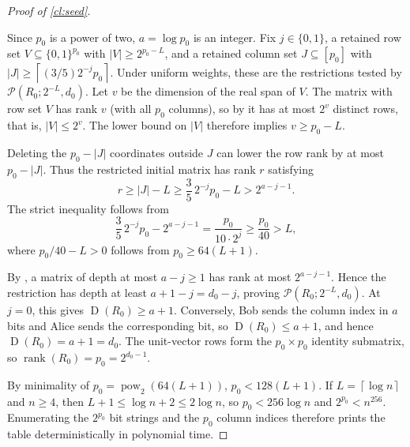 \documentclass[11pt,letterpaper]{article} \usepackage[utf8]{inputenc}
\theoremstyle{plain} \newtheorem{theorem}{Theorem}[section]
\theoremstyle{definition} \newaliascnt{definition}{theorem}
\newcommand{\D}{\operatorname{D}}
\newcommand{\RP}[3]{\mathcal{P}(#1;#2,#3)}
\newcommand{\card}[1]{\lvert#1\rvert}
\newcommand{\ceil}[1]{\left\lceil#1\right\rceil}
\DeclareMathOperator{\rank}{rank} \crefname{claim}{Claim}{Claims}
\begin{document}
\begin{proof}[Proof of \cref{cl:seed}]
\label{proof:cl:seed}

Since \(p_0\) is a power of two, \(a=\log p_0\) is an integer. Fix
\(j\in\{0,1\}\), a retained row set
\(V\subseteq\{0,1\}^{p_0}\) with \(\card V\ge2^{p_0-L}\), and a retained column
set \(J\subseteq[p_0]\) with \(\card J\ge\ceil{(3/5)2^{-j}p_0}\). Under uniform
weights, these are the restrictions tested by \(\RP{R_0}{2^{-L}}{d_0}\). Let \(v\) be
the dimension of the real span of \(V\). The matrix with row set \(V\) has
rank \(v\) (with all \(p_0\) columns), so by \citet[Lemma~4.1(1)]{mackenzie2026condensation} it has at most
\(2^v\) distinct rows, that is, \(\card V\le2^v\). The
lower bound on \(\card V\) therefore implies \(v\ge p_0-L\).

Deleting the \(p_0-\card J\) coordinates outside \(J\) can lower the row rank by
at most \(p_0-\card J\). Thus the restricted initial matrix has rank \(r\)
satisfying
\[
r\ge \card J-L \ge \frac35\,2^{-j}p_0-L >2^{a-j-1}.
\]
The strict inequality follows from
\[
\frac35\,2^{-j}p_0-2^{a-j-1} =\frac{p_0}{10\cdot2^j}\ge\frac{p_0}{40}>L,
\]
where \(p_0/40-L>0\) follows from \(p_0\ge64(L+1)\).

By \citet[Lemma~4.1(2)]{mackenzie2026condensation}, a matrix of
depth at most \(a-j\ge1\) has rank at most \(2^{a-j-1}\). Hence the restriction has
depth at least \(a+1-j=d_0-j\), proving \(\RP{R_0}{2^{-L}}{d_0}\). At \(j=0\), this gives \(\D(R_0)\ge a+1\). Conversely,
Bob sends the column index in \(a\) bits and Alice sends the corresponding bit, so
\(\D(R_0)\le a+1\), and hence \(\D(R_0)=a+1=d_0\). The unit-vector rows form the
\(p_0\times p_0\) identity submatrix, so \(\rank(R_0)=p_0=2^{d_0-1}\).

By minimality of \(p_0=\operatorname{pow}_2(64(L+1))\), \(p_0<128(L+1)\). If \(L=\ceil{\log n}\) and
\(n\ge4\), then \(L+1\le\log n+2\le2\log n\), so \(p_0<256\log n\) and
\(2^{p_0}<n^{256}\). Enumerating the \(2^{p_0}\) bit strings and the \(p_0\) column
indices therefore prints the table deterministically in polynomial time.
\end{proof}
\end{document}

